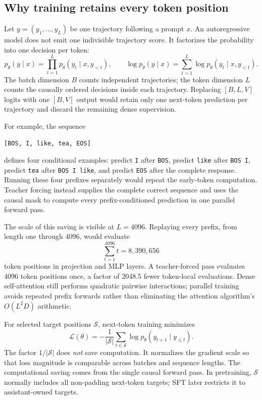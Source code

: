 \subsection{Why training retains every token position}

Let $y=(y_1,\ldots,y_L)$ be one trajectory following a prompt $x$. An autoregressive
model does not emit one indivisible trajectory score. It factorizes the probability into
one decision per token:
\begin{equation}
  p_\theta(y\mid x)=\prod_{t=1}^{L}p_\theta(y_t\mid x,y_{<t}),
  \qquad
  \log p_\theta(y\mid x)=\sum_{t=1}^{L}\log p_\theta(y_t\mid x,y_{<t}).
\end{equation}
The batch dimension $B$ counts independent trajectories; the token dimension $L$ counts
the causally ordered decisions inside each trajectory. Replacing $[B,L,V]$ logits with
one $[B,V]$ output would retain only one next-token prediction per trajectory and discard
the remaining dense supervision.

For example, the sequence
\begin{center}
\texttt{[BOS, I, like, tea, EOS]}
\end{center}
defines four conditional examples: predict \texttt{I} after \texttt{BOS}, predict
\texttt{like} after \texttt{BOS I}, predict \texttt{tea} after \texttt{BOS I like},
and predict \texttt{EOS} after the complete response. Running these four prefixes
separately would repeat the early-token computation. Teacher forcing instead supplies
the complete correct sequence and uses the causal mask to compute every prefix-conditioned
prediction in one parallel forward pass.

The scale of this saving is visible at $L=4096$. Replaying every prefix, from length one
through 4096, would evaluate
\begin{equation}
  \sum_{t=1}^{4096}t=8{,}390{,}656
\end{equation}
token positions in projection and MLP layers. A teacher-forced pass evaluates 4096 token
positions once, a factor of 2048.5 fewer token-local evaluations. Dense self-attention
still performs quadratic pairwise interactions; parallel training avoids repeated prefix
forwards rather than eliminating the attention algorithm's $O(L^2D)$ arithmetic.

For selected target positions $\mathcal{S}$, next-token training minimizes
\begin{equation}
  \mathcal{L}(\theta)
  =-\frac{1}{|\mathcal{S}|}\sum_{t\in\mathcal{S}}
    \log p_\theta(y_{t+1}\mid y_{\leq t}).
\end{equation}
The factor $1/|\mathcal{S}|$ does \emph{not} save computation. It normalizes the gradient
scale so that loss magnitude is comparable across batches and sequence lengths. The
computational saving comes from the single causal forward pass. In pretraining,
$\mathcal{S}$ normally includes all non-padding next-token targets; SFT later restricts
it to assistant-owned targets.

